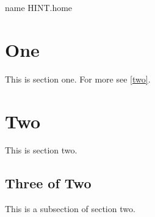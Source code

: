 \documentclass[10pt]{article}
\begin{document}

\ifhint\HINTdest name {HINT.home}\fi
\tableofcontents



\newpage
\section{One}
\label{one}
This is section one.
For more see \autoref{two}.
\newpage
\section{Two}
\label{two}
This is section two.
\newpage
\subsection{Three of Two}
\label{three}
This is a subsection of section two.
\end{document}
